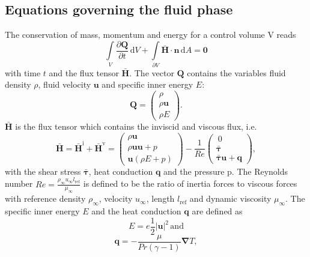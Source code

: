 \documentclass[11pt,a4paper,openany,oneside,parskip=half*]{article}
\renewcommand*\vec[1]{\boldsymbol{#1}}
\renewcommand*\matrix[1]{\boldsymbol{#1}}
\begin{document}
\subsection{Equations governing the fluid phase}
The conservation of mass, momentum and energy for a control volume V reads
\begin{equation} \label{NavierStokes}
  \int\limits_V \frac{\partial{\vec{Q}}}{\partial{t}} \, \mathrm{d} V+ \int\limits_{\partial{V}} \vec{\bar{H}} \cdot \vec{n} \, \mathrm{d} A = \vec0
\end{equation}
with time $t$ and the flux tensor $ \vec{\bar{H}} $.
The vector $ \vec{Q} $ contains the variables fluid density $ \rho $, 
fluid velocity $ \vec{u} $ and specific inner energy $ E $: 
\begin{equation}
 \vec{Q}= \left( \begin{array}{c}\rho\\\rho \vec{u}\\\rho E \end{array} \right).
\end{equation}
$\vec{\bar{H}} $ is the flux tensor which contains the inviscid and viscous flux, i.e.
\begin{equation} 
\vec{\bar{H}} = \vec{\bar{H}^\mathrm{i}} + \vec{\bar{H}^\mathrm{v}} = 
 \left( \begin{array}{c}\rho \vec{u}\\\rho \vec{u} \vec{u} + p\\\vec{u} (\rho E + p) \end{array} \right) - 
 \frac{1}{Re} \left( \begin{array}{c}\ 0 \\ \matrix{\bar{\tau}}\\ \matrix{\bar{\tau}} \vec{u} + \vec{q} \end{array} \right),
\end{equation} 
with the shear stress $\matrix{\bar{\tau}}$, heat conduction $\vec{q}$ and the pressure p. The Reynolds number 
$ Re = \frac{\rho_\infty u_\infty l_\mathrm{ref}}{\mu_\infty} $ is defined to be the ratio of inertia forces to viscous forces with reference density $\rho_\infty$, velocity $u_\infty$, length $l_\mathrm{ref}$ and dynamic viscosity $\mu_\infty$. 
\newline
The specific inner energy $ E $ 
and the heat conduction $ \vec{q}$ are defined as
\begin{equation}
 E = e  \frac{1}{2} \vec{|u|}^2 \, \mathrm{and}
\end{equation}
\begin{equation}
 \vec{q} = - \frac{\mu}{Pr (\gamma - 1)} \vec\nabla T,
\end{equation}
\end{document}
